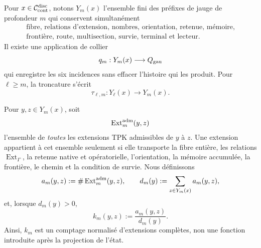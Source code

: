 Pour \(x\in\mathcal C_{\rm cont}^{\rm disc}\), notons
\(Y_m(x)\) l'ensemble fini des préfixes de jauge de profondeur \(m\) qui
conservent simultanément
\begin{equation*}
\begin{gathered}
 \text{fibre, relations d’extension, nombres, orientation, retenue, mémoire,}\\
 \text{frontière, route, multisection, survie, terminal et lecteur}.
\end{gathered}
\end{equation*}
Il existe une application de collier
\begin{equation}\label{eq:gauint-collar}
 q_m:Y_m(x)\longrightarrow Q_{\rm gau}
\end{equation}
qui enregistre les six incidences sans effacer l'histoire qui les produit.
Pour \(\ell\ge m\), la troncature s'écrit
\[
 \tau_{\ell,m}:Y_\ell(x)\longrightarrow Y_m(x).
\]

Pour \(y,z\in Y_m(x)\), soit
\begin{equation}\label{eq:gauint-todas-extensiones}
 \operatorname{Ext}^{\rm adm}_{m}(y,z)
\end{equation}
l'ensemble de \emph{toutes} les extensions TPK admissibles de \(y\) à \(z\).
Une extension appartient à cet ensemble seulement si elle transporte la fibre entière,
les relations \(\operatorname{Ext}_\Gamma\), la retenue native et opératorielle,
l'orientation, la mémoire accumulée, la frontière, le chemin et la condition de
survie. Nous définissons
\begin{equation}\label{eq:gauint-conteo-kernel}
 a_m(y,z):=\#\operatorname{Ext}^{\rm adm}_m(y,z),
 \qquad
 d_m(y):=\sum_{z\in Y_m(x)}a_m(y,z),
\end{equation}
et, lorsque \(d_m(y)>0\),
\begin{equation}\label{eq:gauint-kernel-normalizado}
 k_m(y,z):=\frac{a_m(y,z)}{d_m(y)}.
\end{equation}
Ainsi, \(k_m\) est un comptage normalisé d'extensions complètes, non une
fonction introduite après la projection de l'état.

